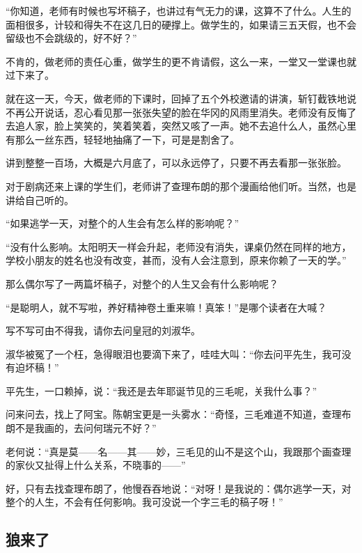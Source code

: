 \par “你知道，老师有时候也写坏稿子，也讲过有气无力的课，这算不了什么。人生的面相很多，计较和得失不在这几日的硬撑上。做学生的，如果请三五天假，也不会留级也不会跳级的，好不好？”
\par 不肯的，做老师的责任心重，做学生的更不肯请假，这么一来，一堂又一堂课也就过下来了。
\par 就在这一天，今天，做老师的下课时，回掉了五个外校邀请的讲演，斩钉截铁地说不再公开说话，忍心看见那一张张失望的脸在华冈的风雨里消失。老师没有反悔了去追人家，脸上笑笑的，笑着笑着，突然又咳了一声。她不去追什么人，虽然心里有那么一丝东西，轻轻地抽痛了一下，可是是割舍了。
\par 讲到整整一百场，大概是六月底了，可以永远停了，只要不再去看那一张张脸。
\par 对于剧病还来上课的学生们，老师讲了查理布朗的那个漫画给他们听。当然，也是讲给自己听的。
\par “如果逃学一天，对整个的人生会有怎么样的影响呢？”
\par “没有什么影响。太阳明天一样会升起，老师没有消失，课桌仍然在同样的地方，学校小朋友的姓名也没有改变，甚而，没有人会注意到，原来你赖了一天的学。”
\par 那么偶尔写了一两篇坏稿子，对整个的人生又会有什么影响呢？
\par “是聪明人，就不写啦，养好精神卷土重来嘛！真笨！”是哪个读者在大喊？
\par 写不写可由不得我，请你去问皇冠的刘淑华。
\par 淑华被冤了一个枉，急得眼泪也要滴下来了，哇哇大叫：“你去问平先生，我可没有迫坏稿！”
\par 平先生，一口赖掉，说：“我还是去年耶诞节见的三毛呢，关我什么事？”
\par 问来问去，找上了阿宝。陈朝宝更是一头雾水：“奇怪，三毛难道不知道，查理布朗不是我画的，去问何瑞元不好？”
\par 老何说：“真是莫——名——其——妙，三毛见的山不是这个山，我跟那个画查理的家伙又扯得上什么关系，不晓事的——”
\par 好，只有去找查理布朗了，他慢吞吞地说：“对呀！是我说的：偶尔逃学一天，对整个的人生，不会有任何影响。我可没说一个字三毛的稿子呀！”


\subsection{狼来了}

